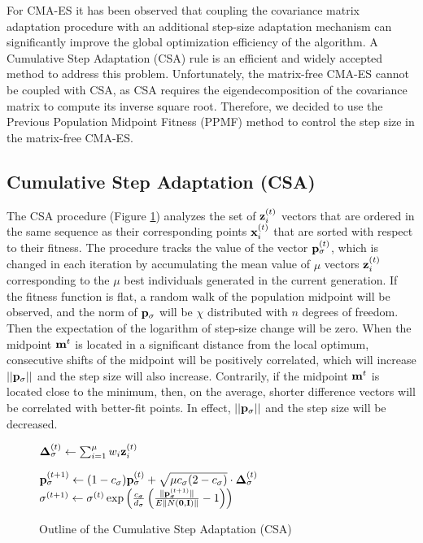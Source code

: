 \documentclass[dvipsnames,format=sigconf,anonymous=false,review=false]{acmart}
\begin{document}
For CMA-ES it has been observed that coupling the covariance matrix adaptation procedure with an additional step-size adaptation mechanism can significantly improve the global optimization efficiency of the algorithm. A Cumulative Step Adaptation (CSA) rule \cite{hansen2006cma} is an efficient and widely accepted method to address this problem. Unfortunately, the matrix-free CMA-ES cannot be coupled with CSA, as CSA requires the eigendecomposition of the covariance matrix to compute its inverse square root. Therefore, we decided to use the Previous Population Midpoint Fitness (PPMF) method \cite{Warchulski2021} to control the step size in the matrix-free CMA-ES.

\subsection{Cumulative Step Adaptation (CSA)}

The CSA procedure (Figure \ref{alg:CSA}) analyzes the set of ${\bf z}_i^{(t)}$ vectors that are ordered in the same sequence as their corresponding points ${\bf x}_i^{(t)}$ that are sorted with respect to their fitness. The procedure tracks the value of the vector ${\bf p}_\sigma^{(t)}$, which is changed in each iteration by accumulating the mean value of $\mu$ vectors ${\bf z}_i^{(t)}$ corresponding to the $\mu$ best individuals generated in the current generation. If the fitness function is flat, a random walk of the population midpoint will be observed, and the norm of ${\bf p}_\sigma$ will be $\chi$ distributed with $n$ degrees of freedom. Then the expectation of the logarithm of step-size change will be zero. When the midpoint ${\bf m}^t$ is located in a significant distance from the local optimum, consecutive shifts of the midpoint will be positively correlated, which will increase $||{\bf p}_\sigma||$ and the step size will also increase. Contrarily, if the midpoint ${\bf m}^t$ is located close to the minimum, then, on the average, shorter difference vectors will be correlated with better-fit points. In effect, $||{\bf p}_\sigma||$ and the step size will be decreased.

\begin{figure}[h!]
\begin{algorithmic}[1]
   
   \STATE ${\bf \Delta}_\sigma^{(t)} \gets \sum_{i=1}^\mu w_i {\bf z}_i^{(t)} $

   \STATE ${\bf p}_\sigma^{(t+1)} \gets (1-c_\sigma){\bf p}_\sigma^{(t)} + \sqrt{\mu c_\sigma(2-c_\sigma)} \cdot {\bf \Delta}_\sigma^{(t)}$
   \STATE $\sigma^{(t+1)} \gets \sigma^{(t)} \exp\left(\frac{c_\sigma}{d_\sigma} \left(\frac{\| {\bf p}_\sigma^{(t+1)} \|}{E\|N({\bf 0},{\bf I})\|}-1\right)\right) $

\end{algorithmic}
\caption{Outline of the Cumulative Step Adaptation (CSA)}
\label{alg:CSA}
\end{figure}
\end{document}

